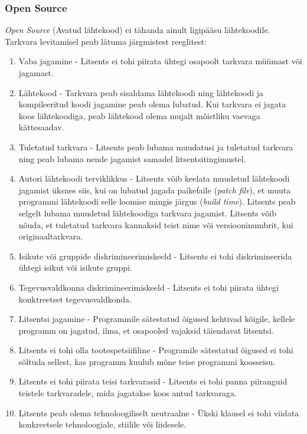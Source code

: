 \documentclass[a4paper,12pt]{article} %
\begin{document}
\subsubsection{Open Source}
\textit{Open Source} (Avatud lähtekood) ei tähanda ainult ligipääsu lähtekoodile. Tarkvara levitamisel peab lätuma järgmistest reeglitest:
\begin{enumerate}
\item Vaba jagamine - Litsents ei tohi piirata ühtegi osapoolt tarkvara müümast või jagamast.
\item Lähtekood -  Tarkvara peab sisaldama lähtekoodi ning lähtekoodi ja kompileeritud koodi jagamine peab olema lubatud. Kui tarkvara ei jagata koos lähtekoodiga, peab lähtekood olema mujalt mõistliku vaevaga kättesaadav.
\item Tuletatud tarkvara - Litsents peab lubama muudatusi ja tuletatud tarkvara ning peab lubama nende jagamist samadel litsentsitingimustel.
\item Autori lähtekoodi terviklikkus - Litsents võib keelata muudetud lähtekoodi jagamist üksnes siis, kui on lubatud jagada paikefaile (\textit{patch file}), et muuta programmi lähtekoodi selle loomise mingis järgus (\textit{build time}). Litsents peab selgelt lubama muudetud lähtekoodiga tarkvara jagamist. Litsents võib nõuda, et tuletatud tarkvara kannaksid teist nime või versiooninumbrit, kui originaaltarkvara.
\item Isikute või gruppide diskrimineerimiskeeld - Litsents ei tohi diskrimineerida ühtegi isikut või isikute gruppi.
\item Tegevusvaldkonna diskrimineerimiskeeld - Litsents ei tohi piirata ühtegi konktreetset tegevusvaldkonda.
\item Litsentsi jagamine - Programmile sätestatud õigused kehtivad kõigile, kellele programm on jagatud, ilma, et osapooled vajaksid täiendavat litsentsi.
\item Litsents ei tohi olla tootespetsiifiline - Programile sätestatud õigused ei tohi sõltuda sellest, kas programm kuulub mõne teise programmi koosseisu.
\item Litsents ei tohi piirata teisi tarkvarasid - Litsents ei tohi panna piiranguid teistele tarkvaradele, mida jagatakse koos antud tarkvaraga.
\item Litsents peab olema tehnoloogiliselt neutraalne - Ükski klausel ei tohi viidata konkreetsele tehnoloogiale, stiilile või liidesele.
\end{enumerate}
\cite{Open_Source_Def}
\end{document}
